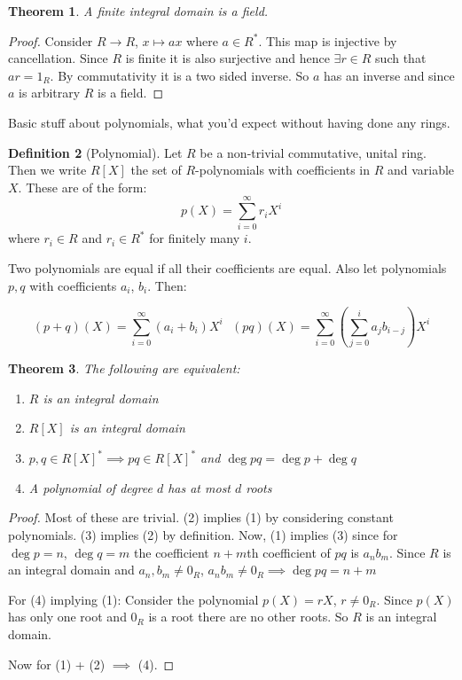 \documentclass[11pt,a4paper]{article}
\newtheorem{theorem}{Theorem}[section]
\theoremstyle{definition}
\newtheorem{definition}[theorem]{Definition}
\begin{document}
\begin{theorem} 
A finite integral domain is a field.
\end{theorem}

\begin{proof}
Consider $R \longrightarrow R$, $x \mapsto ax$ where $a \in R^*$. This map is injective by cancellation. Since $R$ is finite it is also surjective and hence $\exists r \in R$ such that $ar = 1_R$. By commutativity it is a two sided inverse. So $a$ has an inverse and since $a$ is arbitrary $R$ is a field.
\end{proof}

Basic stuff about polynomials, what you'd expect without having done any rings.

\begin{definition}[Polynomial]
Let $R$ be a non-trivial commutative, unital ring. Then we write $R[X]$ the set of $R$-polynomials with coefficients in $R$ and variable $X$. These are of the form:
\[
	p(X) = \sum_{i=0}^\infty r_i X^i
\]
where $r_i \in R$ and $r_i \in R^*$ for finitely many $i$.

Two polynomials are equal if all their coefficients are equal. Also let polynomials $p, q$ with coefficients $a_i$, $b_i$. Then:

\[
	(p + q)(X)= \sum_{i = 0}^\infty(a_i + b_i)X^i \ \ \ (pq)(X) = \sum_{i = 0}^\infty(\sum_{j=0}^{i}a_jb_{i-j})X^i 	  	
\]  
\end{definition}

\begin{theorem}
The following are equivalent:
\begin{enumerate}
	\item $R$ is an integral domain
	\item $R[X]$ is an integral domain
	\item $p, q \in R[X]^* \implies pq \in R[X]^*$ and $\deg pq = \deg p + \deg q$ 
	\item A polynomial of degree $d$ has at most $d$ roots
\end{enumerate}
\end{theorem}

\begin{proof}
Most of these are trivial. (2) implies (1) by considering constant polynomials. (3) implies (2) by definition. Now, (1) implies (3) since for $\deg p = n$, $\deg q = m$ the coefficient $n+m$th coefficient of $pq$ is $a_n b_m$. Since $R$ is an integral domain and $a_n, b_m \neq 0_R$, $a_n b_m \neq 0_R \implies \deg pq = n + m$

For (4) implying (1): Consider the polynomial $p(X) = rX$, $r \neq 0_R$. Since $p(X)$ has only one root and $0_R$ is a root there are no other roots. So $R$ is an integral domain.

Now for (1) + (2) $\implies$ (4). 
\end{proof}
\end{document}
